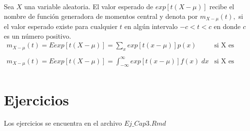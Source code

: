 \begin{tcolorbox}[colframe = white]
    \begin{def.}
	Sea $X$ una variable aleatoria. El valor esperado de $exp[t(X-\mu)]$ recibe el nombre de función generadora de momentos central y denota por $m_{X-\mu}(t),$ si el valor esperado existe para cualquier $t$ en algún intervalo $-c<t<c$ en donde $c$ es un número positivo.
	$$\begin{array}{ll}
	    m_{X-\mu}(t) = E{exp[t(X-\mu)]} = \sum\limits_x exp[t(x-\mu)] p(x) & \mbox{si X es discreta, o}\\\\
	    m_{X-\mu}(t) = E{exp[t(X-\mu)]} = \displaystyle\int_{-\infty}^\infty exp[t(x-\mu)] f(x) \; dx & \mbox{si X es continua}\\
	\end{array}$$
    \end{def.}
\end{tcolorbox}









\section{Ejercicios}

Los ejercicios se encuentra en el archivo $Ej\_Cap3.Rmd$


